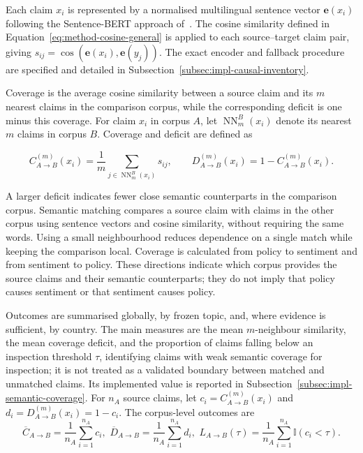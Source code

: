 Each claim $x_i$ is represented by a normalised multilingual sentence vector
$\mathbf{e}(x_i)$ following the Sentence-BERT approach of~\cite{reimers2019sentence}.
The cosine similarity defined in Equation~\ref{eq:method-cosine-general} is applied
to each source--target claim pair, giving
$s_{ij}=\operatorname{cos}\!\left(\mathbf{e}(x_i),\mathbf{e}(y_j)\right)$. The exact
encoder and fallback procedure are specified and detailed in
Subsection~\ref{subsec:impl-causal-inventory}.

Coverage is the average cosine similarity between a source claim and its $m$ nearest
claims in the comparison corpus, while the corresponding deficit is one minus this
coverage. For claim $x_i$ in corpus $A$, let $\operatorname{NN}^{B}_{m}(x_i)$ denote
its nearest $m$ claims in corpus $B$. Coverage and deficit are defined as

\begin{equation}
C_{A\rightarrow B}^{(m)}(x_i)
=
\frac{1}{m}
\sum_{j\in\operatorname{NN}^{B}_{m}(x_i)}s_{ij},
\qquad
D_{A\rightarrow B}^{(m)}(x_i)
=
1-C_{A\rightarrow B}^{(m)}(x_i).
\label{eq:method-semantic-coverage}
\end{equation}

A larger deficit indicates fewer close semantic counterparts in the comparison
corpus. Semantic matching compares a source claim with claims in the
other corpus using sentence vectors and cosine similarity, without requiring the same
words. Using a small neighbourhood reduces dependence on a single match while
keeping the comparison local. Coverage is calculated from policy to sentiment and
from sentiment to policy. These directions indicate which corpus
provides the source claims and their semantic counterparts; they do not imply that
policy causes sentiment or that sentiment causes policy.

Outcomes are summarised globally, by frozen topic, and, where evidence is sufficient,
by country. The main measures are the mean $m$-neighbour similarity, the
mean coverage deficit, and the proportion of claims falling below an
inspection threshold $\tau$, identifying claims with weak semantic
coverage for inspection; it is not treated as a validated boundary between
matched and unmatched claims. Its implemented value is reported in
Subsection~\ref{subsec:impl-semantic-coverage}. For $n_A$ source claims, let
$c_i=C_{A\rightarrow B}^{(m)}(x_i)$ and $d_i=D_{A\rightarrow B}^{(m)}(x_i)=1-c_i$.
The corpus-level outcomes are
\begin{equation}
\overline{C}_{A\rightarrow B}
=
\frac{1}{n_A}\sum_{i=1}^{n_A}c_i,
\,\,
\overline{D}_{A\rightarrow B}
=
\frac{1}{n_A}\sum_{i=1}^{n_A}d_i,
\,\,
L_{A\rightarrow B}(\tau)
=
\frac{1}{n_A}\sum_{i=1}^{n_A}
\mathbb{I}\!\left(c_i<\tau\right).
\label{eq:method-semantic-outcomes}
\end{equation}

